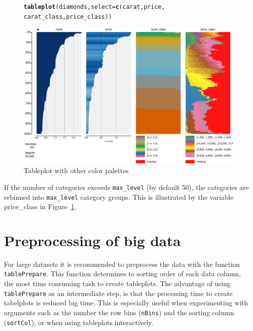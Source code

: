 \documentclass[11pt, fleqn, a4paper]{article}\usepackage[]{graphicx}\usepackage[]{color}
\makeatletter
\def\maxwidth{ %
  \ifdim\Gin@nat@width>\linewidth
    \linewidth
  \else
    \Gin@nat@width
  \fi
}
\newcommand{\hlstd}[1]{\textcolor[rgb]{0.345,0.345,0.345}{#1}}%
\newcommand{\hlkwc}[1]{\textcolor[rgb]{0.333,0.667,0.333}{#1}}%
\newcommand{\hlkwd}[1]{\textcolor[rgb]{0.737,0.353,0.396}{\textbf{#1}}}%
\newenvironment{kframe}{%
 \def\at@end@of@kframe{}%
 \ifinner\ifhmode%
  \def\at@end@of@kframe{\end{minipage}}%
  \begin{minipage}{\columnwidth}%
 \fi\fi%
 \def\FrameCommand##1{\hskip\@totalleftmargin \hskip-\fboxsep
 \colorbox{shadecolor}{##1}\hskip-\fboxsep
     \hskip-\linewidth \hskip-\@totalleftmargin \hskip\columnwidth}%
 \MakeFramed {\advance\hsize-\width
   \@totalleftmargin\z@ \linewidth\hsize
   \@setminipage}}%
 {\par\unskip\endMakeFramed%
 \at@end@of@kframe}
\newenvironment{knitrout}{}{} %
\makeatother
\begin{document}
\begin{figure}[htp]
\begin{knitrout}
\color{fgcolor}\begin{kframe}
\begin{alltt}
\hlkwd{tableplot}\hlstd{(diamonds,} \hlkwc{select} \hlstd{=} \hlkwd{c}\hlstd{(carat, price,}
    \hlstd{carat_class, price_class))}
\end{alltt}
\end{kframe}
\includegraphics[width=\maxwidth]{figure/chunk9} 

\end{knitrout}

\caption{Tableplot with other color palettes}
\label{fig:tphc}
\end{figure}

If the number of categories exceeds {\tt max\_level} (by default 50), the categories are rebinned into {\tt max\_level} category groups. This is illustrated by the variable price\_class in Figure~\ref{fig:tphc}.




\section{Preprocessing of big data}

For large datasets it is recommended to preprocess the data with the function {\tt tablePrepare}. This function determines to sorting order of each data column, the most time consuming task to create tableplots. The advantage of using {\tt tablePrepare} as an intermediate step, is that the processing time to create tabelplots is reduced big time. This is especially useful when experimenting with arguments such as the number the row bins ({\tt nBins}) and the sorting column ({\tt sortCol}), or when using tableplots interactively.
\end{document}
